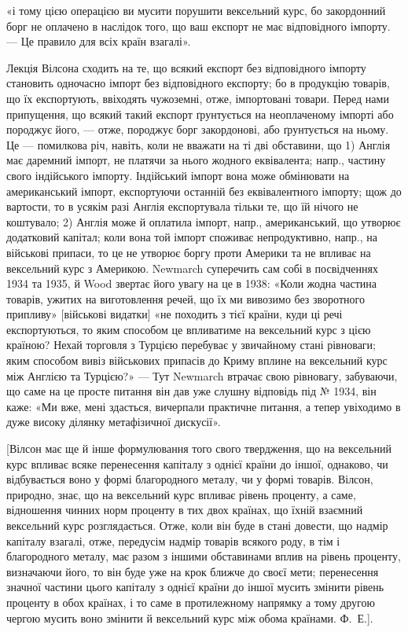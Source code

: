 \parcont{}  %
«і тому цією операцією ви мусити порушити вексельний курс, бо закордонний
борг не оплачено в наслідок того, що ваш експорт не має відповідного імпорту.
— Це правило для всіх країн взагалі».

Лекція Вілсона сходить на те, що всякий експорт без відповідного імпорту
становить одночасно імпорт без відповідного експорту; бо в продукцію товарів,
що їх експортують, ввіходять чужоземні, отже, імпортовані товари. Перед
нами припущення, що всякий такий експорт ґрунтується на неоплаченому
імпорті або породжує його, — отже, породжує борг закордонові, або ґрунтується
на ньому. Це — помилкова річ, навіть, коли не вважати на ті дві обставини,
що 1) Англія має даремний імпорт, не платячи за нього жодного еквівалента;
напр., частину свого індійського імпорту. Індійський імпорт вона може обмінювати
на американський імпорт, експортуючи останній без еквівалентного імпорту;
щож до вартости, то в усякім разі Англія експортувала тільки те, що їй нічого
не коштувало; 2) Англія може й оплатила імпорт, напр., американський, що
утворює додатковий капітал; коли вона той імпорт споживає непродуктивно,
напр., на військові припаси, то це не утворює боргу проти Америки та не
впливає на вексельний курс з Америкою. Newmarch суперечить сам собі в
посвідченнях 1934 та 1935, й Wood звертає його увагу на це в 1938: «Коли
жодна частина товарів, ужитих на виготовлення речей, що їх ми вивозимо без
зворотного припливу» [військові видатки] «не походить з тієї країни, куди ці
речі експортуються, то яким способом це впливатиме на вексельний курс з цією
країною? Нехай торговля з Турцією перебуває у звичайному стані рівноваги;
яким способом вивіз військових припасів до Криму вплине на вексельний курс
між Англією та Турцією?» — Тут Newmarch втрачає свою рівновагу, забуваючи,
що саме на це просте питання він дав уже слушну відповідь під № 1934, він
каже: «Ми вже, мені здасться, вичерпали практичне питання, а тепер увіходимо
в дуже високу ділянку метафізичної дискусії».

[Вілсон має ще й інше формулювання того свого твердження, що на вексельний
курс впливає всяке перенесення капіталу з однієї країни до іншої, однаково,
чи відбувається воно у формі благородного металу, чи у формі товарів.
Вілсон, природно, знає, що на вексельний курс впливає рівень проценту, а
саме, відношення чинних норм проценту в тих двох країнах, що їхній взаємний
вексельний курс розглядається. Отже, коли він буде в стані довести, що надмір
капіталу взагалі, отже, передусім надмір товарів всякого роду, в тім і благородного
металу, має разом з іншими обставинами вплив на рівень проценту, визначаючи
його, то він буде уже на крок ближче до своєї мети; перенесення
значної частини цього капіталу з однієї країни до іншої мусить змінити рівень
проценту в обох країнах, і то саме в протилежному напрямку а тому другою
чергою мусить воно змінити й вексельний курс між обома країнами. Ф.~Е.].

